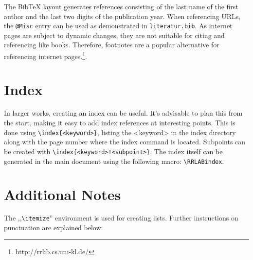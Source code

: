 The BibTeX layout generates references consisting of the last name of the first author and the last two digits of the publication year. When referencing URLs, the \verb|@Misc| entry can be used as demonstrated in \verb|literatur.bib|. As internet pages are subject to dynamic changes, they are not suitable for citing and referencing like books. Therefore, footnotes are a popular alternative for referencing internet pages.\footnote{http://rrlib.cs.uni-kl.de/}.


\section{Index}
\label{sec:floats:index}
 In larger works, creating an index can be useful. It's advisable to plan this from the start, making it easy to add index references at interesting points. This is done using \verb|\index{<keyword>}|, listing the <keyword> in the index directory along with the page number where the index command is located. Subpoints can be created with \verb|\index{<keyword>!<subpoint>}|. The index itself can be generated in the main document using the following macro: \verb|\RRLABindex|.

\section{Additional Notes}

The ,,\verb|\itemize|'' environment is used for creating lists. Further instructions on punctuation are explained below:

